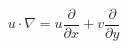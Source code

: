 \documentclass[preview,border=2pt]{standalone}
\begin{document}
\[
u\cdot\nabla = u\frac{\partial}{\partial x}+v\frac{\partial}{\partial y}
\]
\end{document}
